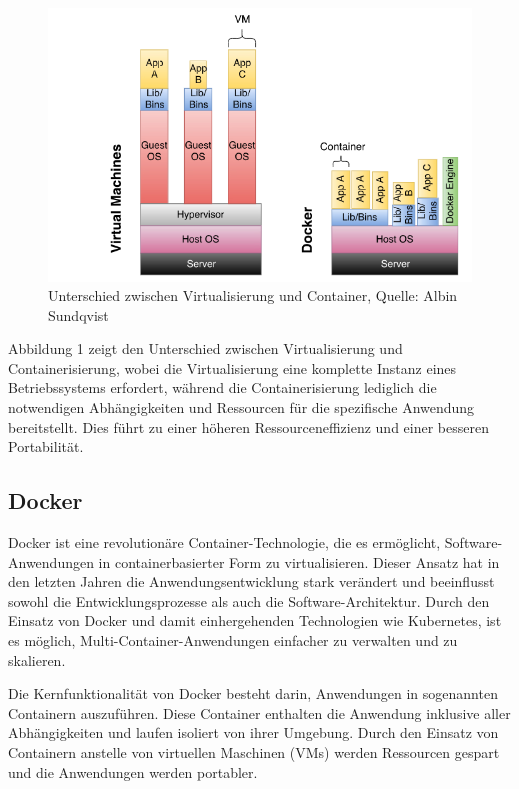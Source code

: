 \begin{figure}[h]
	\includegraphics[width=\columnwidth]{gfx/vm vs container.png} %
	\caption{Unterschied zwischen Virtualisierung und Container, Quelle: Albin Sundqvist \cite{sundqvist2020guidelines}}
\end{figure}

Abbildung 1 zeigt den Unterschied zwischen Virtualisierung und Containerisierung, wobei die Virtualisierung eine komplette Instanz eines Betriebssystems erfordert, während die Containerisierung lediglich die notwendigen Abhängigkeiten und Ressourcen für die spezifische Anwendung bereitstellt. Dies führt zu einer höheren Ressourceneffizienz und einer besseren Portabilität.

\subsection{Docker}

Docker ist eine revolutionäre Container-Technologie, die es ermöglicht, Software-Anwendungen in containerbasierter Form zu virtualisieren. Dieser Ansatz hat in den letzten Jahren die Anwendungsentwicklung stark verändert und beeinflusst sowohl die Entwicklungsprozesse als auch die Software-Architektur. Durch den Einsatz von Docker und damit einhergehenden Technologien wie Kubernetes, ist es möglich, Multi-Container-Anwendungen einfacher zu verwalten und zu skalieren.

Die Kernfunktionalität von Docker besteht darin, Anwendungen in sogenannten Containern auszuführen. Diese Container enthalten die Anwendung inklusive aller Abhängigkeiten und laufen isoliert von ihrer Umgebung. Durch den Einsatz von Containern anstelle von virtuellen Maschinen (VMs) werden Ressourcen gespart und die Anwendungen werden portabler.

